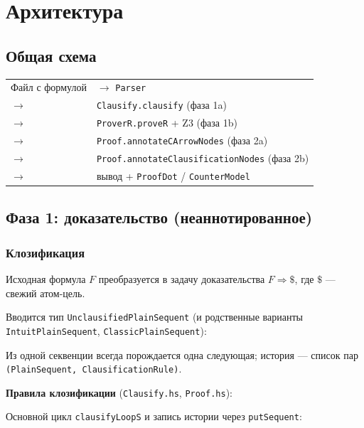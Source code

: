 \documentclass[a4paper,12pt]{article}
\newenvironment{listingcenter}{%
  \begin{center}\begin{minipage}{\linewidth}%
}{%
  \end{minipage}\end{center}%
}
\newcommand{\hssnippet}[2]{%
  \begin{listingcenter}%
  \end{listingcenter}}
\begin{document}
\section{Архитектура}

\subsection{Общая схема}

\begin{center}
\begin{tabular}{ll}
Файл с формулой & $\to$ \texttt{Parser} \\
$\to$ & \texttt{Clausify.clausify} (фаза 1a) \\
$\to$ & \texttt{ProverR.proveR} + Z3 (фаза 1b) \\
$\to$ & \texttt{Proof.annotateCArrowNodes} (фаза 2a) \\
$\to$ & \texttt{Proof.annotateClausificationNodes} (фаза 2b) \\
$\to$ & вывод + \texttt{ProofDot} / \texttt{CounterModel}
\end{tabular}
\end{center}

\subsection{Фаза 1: доказательство (неаннотированное)}

\subsubsection{Клозификация}

Исходная формула $F$ преобразуется в задачу доказательства $F \Rightarrow \$$,
где $\$$ --- свежий атом-цель.

Вводится тип \texttt{UnclausifiedPlainSequent} (и родственные варианты
\texttt{IntuitPlainSequent}, \texttt{ClassicPlainSequent}):
\hssnippet{plain-sequent.hs}{Типы секвенций \texttt{PlainSequent} (\texttt{Sequent.hs})}

Из одной секвенции всегда порождается одна следующая; история --- список пар
\texttt{(PlainSequent, ClausificationRule)}.

\textbf{Правила клозификации} (\texttt{Clausify.hs}, \texttt{Proof.hs}):
\hssnippet{clausification-rules.hs}{Перечисление правил клозификации (\texttt{Proof.hs})}

Основной цикл \texttt{clausifyLoopS} и запись истории через \texttt{putSequent}:
\hssnippet{clausify-loop.hs}{Цикл \texttt{clausifyLoopS} и запись истории (\texttt{Clausify.hs})}
\end{document}
